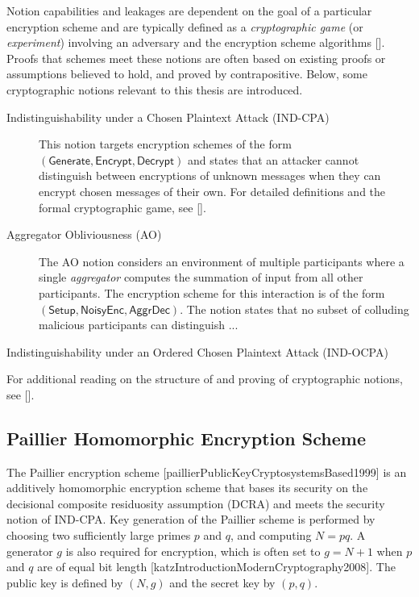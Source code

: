 Notion capabilities and leakages are dependent on the goal of a particular encryption scheme and are typically defined as a \textit{cryptographic game} (or \textit{experiment}) involving an adversary and the encryption scheme algorithms []. Proofs that schemes meet these notions are often based on existing proofs or assumptions believed to hold, and proved by contrapositive. Below, some cryptographic notions relevant to this thesis are introduced.
\begin{description}
    \item[Indistinguishability under a Chosen Plaintext Attack (IND-CPA)] This notion targets encryption schemes of the form $(\mathsf{Generate},\mathsf{Encrypt},\mathsf{Decrypt})$ and states that an attacker cannot distinguish between encryptions of unknown messages when they can encrypt chosen messages of their own. For detailed definitions and the formal cryptographic game, see [].
    \item[Aggregator Obliviousness (AO)] The AO notion considers an environment of multiple participants where a single \textit{aggregator} computes the summation of input from all other participants. The encryption scheme for this interaction is of the form $(\mathsf{Setup},\mathsf{NoisyEnc},\mathsf{AggrDec})$. The notion states that no subset of colluding malicious participants can distinguish ...
    \item[Indistinguishability under an Ordered Chosen Plaintext Attack (IND-OCPA)] 
\end{description}
For additional reading on the structure of and proving of cryptographic notions, see [].

% 
% 

\subsection{Paillier Homomorphic Encryption Scheme}
The Paillier encryption scheme [paillierPublicKeyCryptosystemsBased1999] is an additively homomorphic encryption scheme that bases its security on the decisional composite residuosity assumption (DCRA) and meets the security notion of IND-CPA. Key generation of the Paillier scheme is performed by choosing two sufficiently large primes $p$ and $q$, and computing $N=pq$. A generator $g$ is also required for encryption, which is often set to $g=N+1$ when $p$ and $q$ are of equal bit length [katzIntroductionModernCryptography2008]. The public key is defined by $(N, g)$ and the secret key by $(p, q)$.

